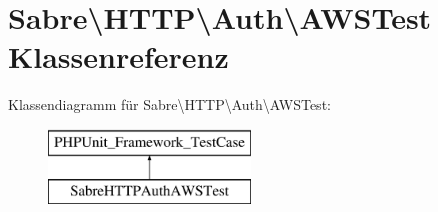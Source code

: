 \hypertarget{class_sabre_1_1_h_t_t_p_1_1_auth_1_1_a_w_s_test}{}\section{Sabre\textbackslash{}H\+T\+TP\textbackslash{}Auth\textbackslash{}A\+W\+S\+Test Klassenreferenz}
\label{class_sabre_1_1_h_t_t_p_1_1_auth_1_1_a_w_s_test}
Klassendiagramm für Sabre\textbackslash{}H\+T\+TP\textbackslash{}Auth\textbackslash{}A\+W\+S\+Test\+:\begin{figure}[H]
\begin{center}
\leavevmode
\includegraphics[height=2.000000cm]{class_sabre_1_1_h_t_t_p_1_1_auth_1_1_a_w_s_test}
\end{center}
\end{figure}
